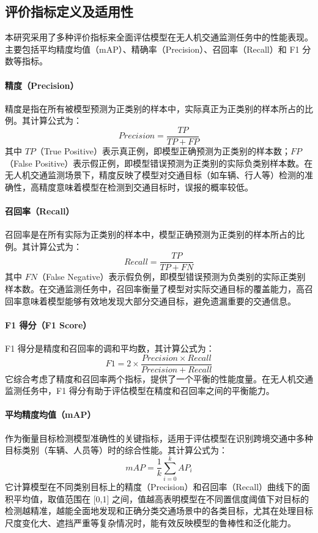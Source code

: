 \documentclass[runningheads]{llncs}
\begin{document}
\subsection{评价指标定义及适用性}

本研究采用了多种评价指标来全面评估模型在无人机交通监测任务中的性能表现。主要包括平均精度均值（mAP）、精确率（Precision）、召回率（Recall）和 F1 分数等指标。

\paragraph{精度（Precision）}
精度是指在所有被模型预测为正类别的样本中，实际真正为正类别的样本所占的比例。其计算公式为：$$Precision = \frac{TP}{TP + FP}$$ 其中 $TP$（True Positive）表示真正例，即模型正确预测为正类别的样本数；$FP$（False Positive）表示假正例，即模型错误预测为正类别的实际负类别样本数。在无人机交通监测场景下，精度反映了模型对交通目标（如车辆、行人等）检测的准确性，高精度意味着模型在检测到交通目标时，误报的概率较低。

\paragraph{召回率（Recall）}
召回率是在所有实际为正类别的样本中，模型正确预测为正类别的样本所占的比例。其计算公式为：$$Recall = \frac{TP}{TP + FN}$$ 其中 $FN$（False Negative）表示假负例，即模型错误预测为负类别的实际正类别样本数。在交通监测任务中，召回率衡量了模型对实际交通目标的覆盖能力，高召回率意味着模型能够有效地发现大部分交通目标，避免遗漏重要的交通信息。

\paragraph{F1 得分（F1 Score）}
F1 得分是精度和召回率的调和平均数，其计算公式为：$$F1 = 2 \times \frac{Precision \times Recall}{Precision + Recall}$$ 它综合考虑了精度和召回率两个指标，提供了一个平衡的性能度量。在无人机交通监测任务中，F1 得分有助于评估模型在精度和召回率之间的平衡能力。

\paragraph{平均精度均值（mAP）}
作为衡量目标检测模型准确性的关键指标，适用于评估模型在识别跨境交通中多种目标类别（车辆、人员等）时的综合性能。其计算公式为：$$mAP=\frac{1}{k} \sum_{i=0}^{k}AP_i$$ 它计算模型在不同类别目标上的精度（Precision）和召回率（Recall）曲线下的面积平均值，取值范围在 [0,1] 之间，值越高表明模型在不同置信度阈值下对目标的检测越精准，越能全面地发现和正确分类交通场景中的各类目标，尤其在处理目标尺度变化大、遮挡严重等复杂情况时，能有效反映模型的鲁棒性和泛化能力。
\end{document}

